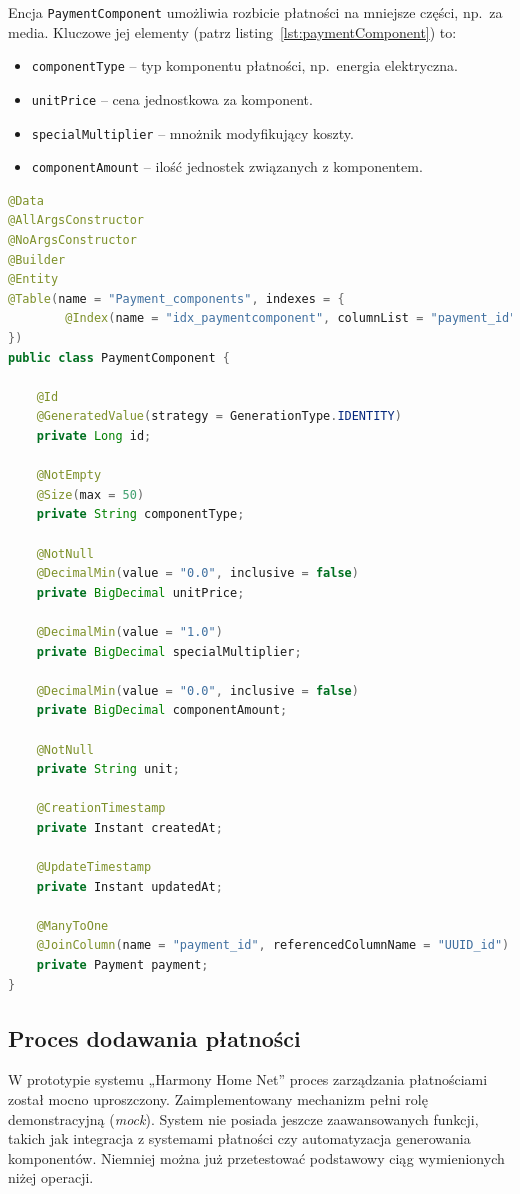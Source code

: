 \noindent Encja \texttt{PaymentComponent} umożliwia rozbicie płatności na mniejsze części, np.\ za media. Kluczowe jej elementy (patrz listing~\ref{lst:paymentComponent}) to:
\begin{itemize}
    \item \texttt{componentType} -- typ komponentu płatności, np.\ energia elektryczna.
    \item \texttt{unitPrice} -- cena jednostkowa za komponent.
    \item \texttt{specialMultiplier} -- mnożnik modyfikujący koszty.
    \item \texttt{componentAmount} -- ilość jednostek związanych z komponentem.
\end{itemize}

\begin{lstlisting}[language=Java, style=JavaStyle, caption=Kod encji \texttt{PaymentComponent}, label=lst:paymentComponent]
@Data
@AllArgsConstructor
@NoArgsConstructor
@Builder
@Entity
@Table(name = "Payment_components", indexes = {
        @Index(name = "idx_paymentcomponent", columnList = "payment_id")
})
public class PaymentComponent {

    @Id
    @GeneratedValue(strategy = GenerationType.IDENTITY)
    private Long id;

    @NotEmpty
    @Size(max = 50)
    private String componentType;

    @NotNull
    @DecimalMin(value = "0.0", inclusive = false)
    private BigDecimal unitPrice;

    @DecimalMin(value = "1.0")
    private BigDecimal specialMultiplier;

    @DecimalMin(value = "0.0", inclusive = false)
    private BigDecimal componentAmount;

    @NotNull
    private String unit;

    @CreationTimestamp
    private Instant createdAt;

    @UpdateTimestamp
    private Instant updatedAt;

    @ManyToOne
    @JoinColumn(name = "payment_id", referencedColumnName = "UUID_id")
    private Payment payment;
}
\end{lstlisting}

\subsection{Proces dodawania płatności}
W prototypie systemu „Harmony Home Net” proces zarządzania płatnościami został mocno uproszczony. Zaimplementowany mechanizm pełni rolę demonstracyjną (\emph{mock}). System nie posiada jeszcze zaawansowanych funkcji, takich jak integracja z systemami płatności czy automatyzacja generowania komponentów. Niemniej można już przetestować podstawowy ciąg wymienionych niżej operacji. 

